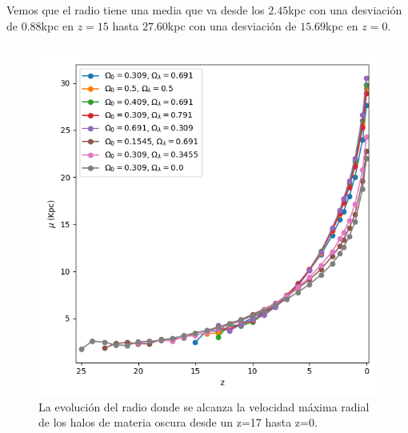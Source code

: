 \documentclass{beamer}
\begin{document}
	\begin{frame}
		\small Vemos que el radio tiene una media que va desde los $2.45$kpc con una desviación de $0.88$kpc en $z=15$ hasta $27.60$kpc con una desviación de $15.69$kpc en $z=0$.
		
		\begin{columns}[t]
			\begin{column}{.5\textwidth}
				\begin{figure}
					\centering
					\includegraphics[scale=0.3]{Conc/VMaxRad_Mean_Conc.png}
					\caption{\footnotesize La evolución del radio donde se alcanza la velocidad máxima radial de los halos de materia oscura desde un z=17 hasta z=0.}
					\label{fig:Conc-VMAxRadMean}
				\end{figure}
			\end{column}


\end{columns}
\end{frame}
\end{document}

